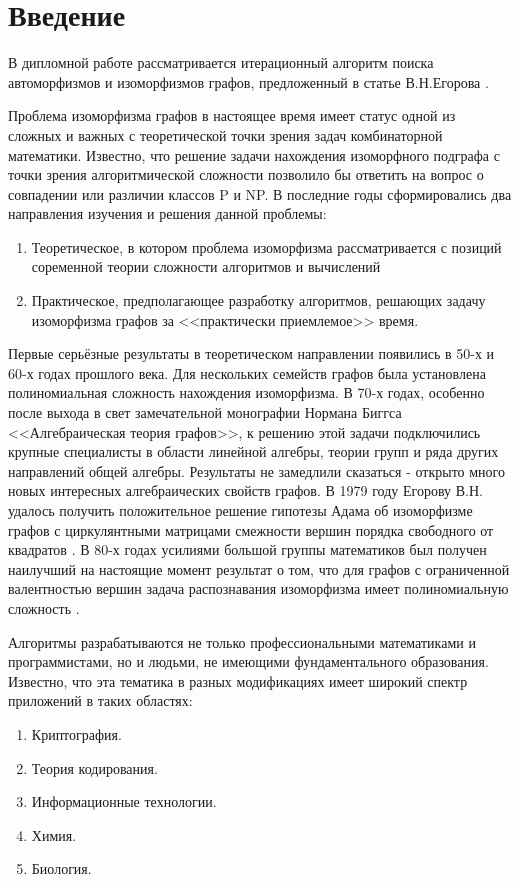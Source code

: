 \section*{Введение}
\label{sec:Introduction} 
\large 

В дипломной работе рассматривается итерационный алгоритм поиска автоморфизмов и изоморфизмов графов, предложенный в статье В.Н.Егорова \cite{ArtMain_Egorov}.

Проблема изоморфизма графов в настоящее время имеет статус одной из сложных и важных с теоретической точки зрения задач комбинаторной математики. Известно, что решение задачи нахождения изоморфного подграфа с точки зрения алгоритмической сложности позволило бы ответить на вопрос о совпадении или различии классов P и NP. В последние годы сформировались два направления изучения и решения данной проблемы:
\begin{enumerate}
\item Теоретическое, в котором проблема изоморфизма рассматривается с позиций соременной теории сложности алгоритмов и вычислений
\item Практическое, предполагающее разработку алгоритмов, решающих задачу изоморфизма графов за <<практически приемлемое>> время.
\end{enumerate}

Первые серьёзные результаты в теоретическом направлении появились в 50-х и 60-х годах прошлого века. Для нескольких семейств графов была установлена полиномиальная сложность нахождения изоморфизма. В 70-х годах, особенно после выхода в свет замечательной монографии Нормана Биггса <<Алгебраическая теория графов>>, к решению этой задачи подключились крупные специалисты в области линейной алгебры, теории групп и ряда других направлений общей алгебры. Результаты не замедлили сказаться - открыто много новых интересных алгебраических свойств графов. В 1979 году Егорову В.Н. удалось получить положительное решение гипотезы Адама об изоморфизме графов с циркулянтными матрицами смежности вершин порядка свободного от квадратов \cite{ArtCircul_EgorovMarkov}. В 80-х годах усилиями большой группы математиков был получен наилучший на настоящие момент результат о том, что для графов с ограниченной валентностью вершин задача распознавания изоморфизма имеет полиномиальную сложность \cite{ArtBoundValence_Luks}.

Алгоритмы разрабатываются не только профессиональными математиками и программистами, но и людьми, не имеющими фундаментального образования. Известно, что эта тематика в разных модификациях имеет широкий спектр приложений в таких областях:
\begin{enumerate}
\item Криптография.
\item Теория кодирования.
\item Информационные технологии.
\item Химия.
\item Биология.
\end{enumerate}

